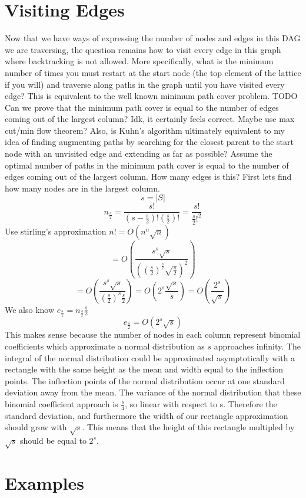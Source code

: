 \documentclass{article}
\begin{document}
\section{Visiting Edges}
Now that we have ways of expressing the number of nodes and edges in this DAG
we are traversing, the question remains how to visit every edge in this graph
where backtracking is not allowed. More specifically, what is the minimum
number of times you must restart at the start node (the top element of the
lattice if you will) and traverse along paths in the graph until you have
visited every edge? This is equivalent to the well known minimum path cover
problem.  TODO Can we prove that the minimum path cover is equal to the number
of edges coming out of the largest column? Idk, it certainly feels correct.
Maybe use max cut/min flow theorem? Also, is Kuhn's algorithm ultimately
equivalent to my idea of finding augmenting paths by searching for the closest
parent to the start node with an unvisited edge and extending as far as
possible?  Assume the optimal number of paths in the minimum path cover is
equal to the number of edges coming out of the largest column. How many edges
is this? First lets find how many nodes are in the largest column.
$$s = |S|$$
$$n_{\frac{s}{2}} = \frac{s!}{(s - \frac{s}{2})!(\frac{s}{2})!} = \frac{s!}{\frac{s}{2}!^2}$$
Use stirling's approximation $n! = O(n^n\sqrt{n})$
$$ = O(\frac{s^s\sqrt{s}}{((\frac{s}{2})^\frac{s}{2}\sqrt{\frac{s}{2}})^2})$$
$$ = O(\frac{s^s\sqrt{s}}{(\frac{s}{2})^s\frac{s}{2}}) = O(2^s\frac{\sqrt{s}}{s}) = O(\frac{2^s}{\sqrt{s}})$$
We also know $e_{\frac{s}{2}} = n_{\frac{s}{2}}\frac{s}{2}$
$$e_{\frac{s}{2}} = O(2^s\sqrt{s})$$
This makes sense because the number of nodes in each column represent binomial coefficients which approximate a normal distribution as $s$ approaches infinity. The integral of the normal distribution could be approximated asymptotically with a rectangle with the same height as the mean and width equal to the inflection points. The inflection points of the normal distribution occur at one standard deviation away from the mean. The variance of the normal distribution that these binomial coefficient approach is $\frac{s}{4}$, so linear with respect to s. Therefore the standard deviation, and furthermore the width of our rectangle approximation should grow with $\sqrt{s}$. This means that the height of this rectangle multipled by $\sqrt{s}$ should be equal to $2^s$.

\section{Examples}
\end{document}
